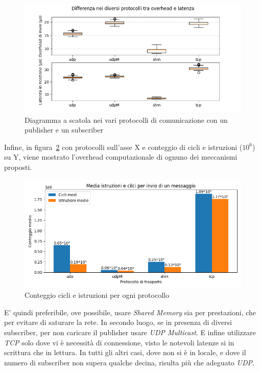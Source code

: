 \begin{figure}[H]
    \includegraphics[width=\textwidth]{./results/test1_box_sr_1p1s.png} 
        \caption{Diagramma a scatola nei vari protocolli di comunicazione con un publisher e un subscriber}\label{fig:test1sdbox}
\end{figure}
Infine, in figura~\ref{fig:test3_cycle_different_protocols} con protocolli sull'asse X e conteggio di cicli e istruzioni ($10^6$) su Y, viene mostrato l'overhead computazionale di ognuno dei meccanismi proposti.
\begin{figure}[H]
    \includegraphics[width=\textwidth]{./results/test1_cyclinstr.png} 
        \caption{Conteggio cicli e istruzioni per ogni protocollo}\label{fig:test3_cycle_different_protocols}
\end{figure}
E' quindi preferibile, ove possibile, usare \emph{Shared Memory} sia per prestazioni, che per evitare di saturare la rete. In secondo luogo, se in presenza di diversi subscriber, per non caricare il publisher usare \emph{UDP Multicast}. E infine utilizzare \emph{TCP} solo dove vi è necessità di connessione, visto le notevoli latenze si in scrittura che in lettura. In tutti gli altri casi, dove non si è in locale, e dove il numero di subscriber non supera qualche decina, risulta più che adeguato \emph{UDP}.

